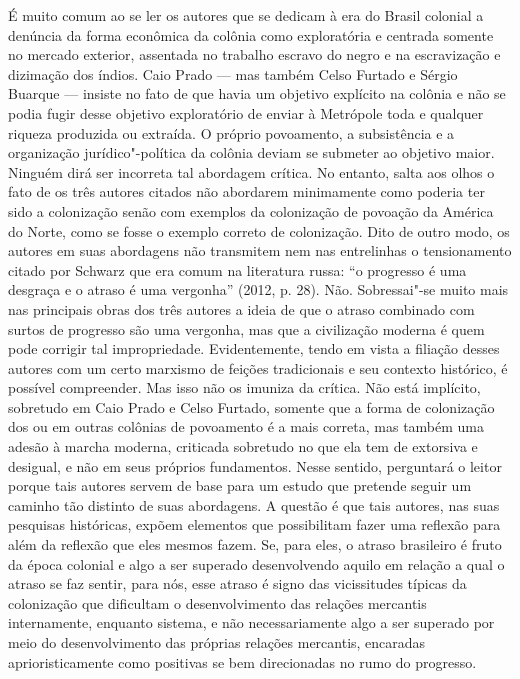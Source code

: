 É muito comum ao se ler os autores que se dedicam à era do Brasil
colonial a denúncia da forma econômica da colônia como exploratória e
centrada somente no mercado exterior, assentada no trabalho escravo do
negro e na escravização e dizimação dos índios. Caio Prado --- mas também
Celso Furtado e Sérgio Buarque --- insiste no fato de que havia um
objetivo explícito na colônia e não se podia fugir desse objetivo
exploratório de enviar à Metrópole toda e qualquer riqueza produzida ou
extraída. O próprio povoamento, a subsistência e a organização
jurídico"-política da colônia deviam se submeter ao objetivo maior.
Ninguém dirá ser incorreta tal abordagem crítica. No entanto, salta aos
olhos o fato de os três autores citados não abordarem minimamente como
poderia ter sido a colonização senão com exemplos da colonização de
povoação da América do Norte, como se fosse o exemplo correto de
colonização. Dito de outro modo, os autores em suas abordagens não
transmitem nem nas entrelinhas o tensionamento citado por Schwarz que
era comum na literatura russa: ``o progresso é uma desgraça e o atraso é
uma vergonha'' (2012, p. 28). Não. Sobressai"-se muito mais nas
principais obras dos três autores a ideia de que o atraso combinado com
surtos de progresso são uma vergonha, mas que a civilização moderna é
quem pode corrigir tal impropriedade. Evidentemente, tendo em vista a
filiação desses autores com um certo marxismo de feições tradicionais e
seu contexto histórico, é possível compreender. Mas isso não os imuniza
da crítica. Não está implícito, sobretudo em Caio Prado e Celso Furtado,
somente que a forma de colonização dos  ou em outras colônias de
povoamento é a mais correta, mas também uma adesão à marcha moderna,
criticada sobretudo no que ela tem de extorsiva e desigual, e não em
seus próprios fundamentos. Nesse sentido, perguntará o leitor porque
tais autores servem de base para um estudo que pretende seguir um
caminho tão distinto de suas abordagens. A questão é que tais autores,
nas suas pesquisas históricas, expõem elementos que possibilitam fazer
uma reflexão para além da reflexão que eles mesmos fazem. Se, para eles,
o atraso brasileiro é fruto da época colonial e algo a ser superado
desenvolvendo aquilo em relação a qual o atraso se faz sentir, para nós,
esse atraso é signo das vicissitudes típicas da colonização que
dificultam o desenvolvimento das relações mercantis internamente,
enquanto sistema, e não necessariamente algo a ser superado por meio do
desenvolvimento das próprias relações mercantis, encaradas
aprioristicamente como positivas se bem direcionadas no rumo do
progresso.

